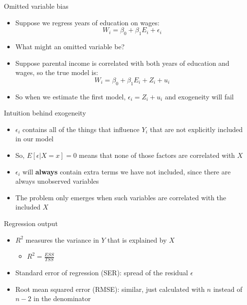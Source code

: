 \documentclass[aspectratio=169]{beamer}
\begin{document}
\begin{frame}{Omitted variable bias}
    \begin{itemize}
        \item Suppose we regress years of education on wages:
        $$
            W_i = \beta_0 + \beta_1 E_i + \epsilon_i
        $$
        \item What might an omitted variable be?
        \item Suppose parental income is correlated with both years of education and wages, so the true model is:
        $$
            W_i = \beta_0 + \beta_1 E_i + Z_i + u_i
        $$
        \item So when we estimate the first model, $\epsilon_i = Z_i + u_i $ and exogeneity will fail
    \end{itemize}
\end{frame}

\begin{frame}{Intuition behind exogeneity}
    \begin{itemize}
        \item $\epsilon_i$ contains all of the things that influence $Y_i$ that are not explicitly included in our model
        \item So, $E[\epsilon | X=x] = 0$ means that none of those factors are correlated with $X$
        \item $\epsilon_i$ will \textbf{always} contain extra terms we have not included, since there are always unobserved variables
        \item The problem only emerges when such variables are correlated with the included $X$
    \end{itemize}
\end{frame}

\begin{frame}{Regression output}
    \begin{itemize}
        \item $R^2$ measures the variance in $Y$ that is explained by $X$
        \begin{itemize}
            \item $R^2 = \frac{ESS}{TSS}$
        \end{itemize}
        \item Standard error of regression (SER): spread of the residual $\epsilon$
        \item Root mean squared error (RMSE): similar, just calculated with $n$ instead of $n-2$ in the denominator
    \end{itemize}
\end{frame}
\end{document}
